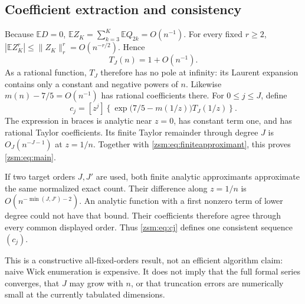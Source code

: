 \documentclass[11pt]{article}
\theoremstyle{definition}\newtheorem{definition}[theorem]{Definition}
\theoremstyle{remark}\newtheorem{remark}[theorem]{Remark}
\newcommand{\E}{\mathbb E}
\begin{document}
\subsection{Coefficient extraction and consistency}
Because $\E D=0$,
$\E Z_K=\sum_{k=3}^K\E Q_{2k}=O(n^{-1})$. For every fixed $r\ge2$,
$|\E Z_K^r|\le\|Z_K\|_r^r=O(n^{-r/2})$. Hence
\[
 T_J(n)=1+O(n^{-1}).
\]
As a rational function, $T_J$ therefore has no pole at infinity: its Laurent
expansion contains only a constant and negative powers of $n$. Likewise
$m(n)-7/5=O(n^{-1})$ has rational coefficients there. For $0\le j\le J$,
define
\begin{equation}\label{zsm:eq:cj}
 c_j=[z^j]\left\{\exp\bigl(7/5-m(1/z)\bigr)T_J(1/z)\right\}.
\end{equation}
The expression in braces is analytic near $z=0$, has constant term one, and
has rational Taylor coefficients. Its finite Taylor remainder through degree
$J$ is $O_J(n^{-J-1})$ at $z=1/n$. Together with
\eqref{zsm:eq:finiteapproximant}, this proves \eqref{zsm:eq:main}.

If two target orders $J,J'$ are used, both finite analytic approximants
approximate the same normalized exact count. Their difference along $z=1/n$
is $O(n^{-\min(J,J')-2})$. An analytic function with a first nonzero term of
lower degree could not have that bound. Their coefficients therefore agree
through every common displayed order. Thus \eqref{zsm:eq:cj} defines one consistent
sequence $(c_j)$.

This is a constructive all-fixed-orders result, not an efficient algorithm
claim: naive Wick enumeration is expensive. It does not imply that the full
formal series converges, that $J$ may grow with $n$, or that truncation errors
are numerically small at the currently tabulated dimensions.
\end{document}
